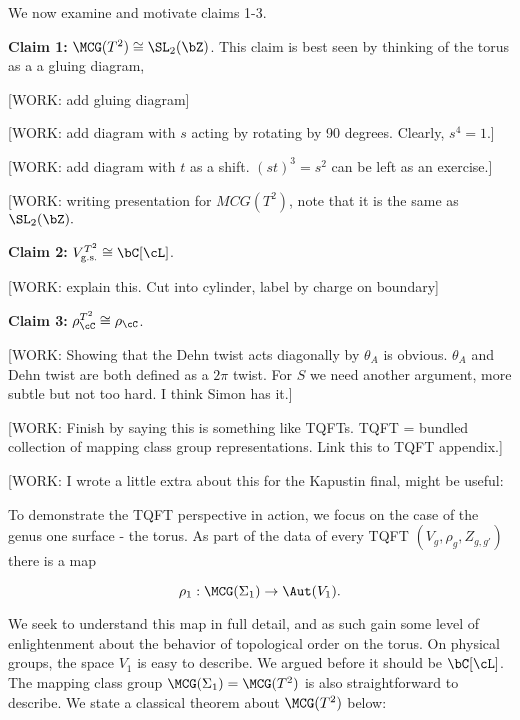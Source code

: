 We now examine and motivate claims 1-3.

\textbf{Claim 1:} $\MCG(T^2)\cong \SL_2(\bZ)$. This claim is best seen by thinking of the torus as a a gluing diagram,

[WORK: add gluing diagram]

[WORK: add diagram with $s$ acting by rotating by 90 degrees. Clearly, $s^4=1$.]

[WORK: add diagram with $t$ as a shift. $(st)^3=s^2$ can be left as an exercise.]

[WORK: writing presentation for $MCG(T^2)$, note that it is the same as $\SL_2(\bZ).$

\textbf{Claim 2:} $V_{\text{g.s.}}^{T^2}\cong \bC[\cL]$.

[WORK: explain this. Cut into cylinder, label by charge on boundary]

\textbf{Claim 3:} $\rho_{\cC}^{T^2}\cong \rho_{\cC}$.

[WORK: Showing that the Dehn twist acts diagonally by $\theta_A$ is obvious. $\theta_A$ and Dehn twist are both defined as a $2\pi$ twist. For $S$ we need another argument, more subtle but not too hard. I think Simon has it.]


[WORK: Finish by saying this is something like TQFTs. TQFT = bundled collection of mapping class group representations. Link this to TQFT appendix.]

[WORK: I wrote a little extra about this for the Kapustin final, might be useful:

To demonstrate the TQFT perspective in action, we focus on the case of the genus one surface - the torus. As part of the data of every TQFT $(V_g, \rho_g, Z_{g,g'})$ there is a map

$$\rho_1:\MCG(\Sigma_1)\to \Aut(V_1).$$

We seek to understand this map in full detail, and as such gain some level of enlightenment about the behavior of topological order on the torus. On physical groups, the space $V_1$ is easy to describe. We argued before it should be $\bC[\cL]$. The mapping class group $\MCG(\Sigma_1)=\MCG(T^2)$ is also straightforward to describe. We state a classical theorem about $\MCG(T^2)$ below:

